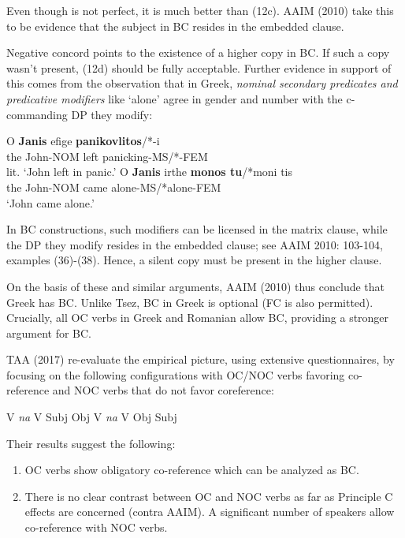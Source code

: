 \documentclass[output=paper]{langsci/langscibook}
\begin{document}
Even though  is not perfect, it is much better than (12c). AAIM (2010) take this to be evidence that the subject in BC resides in the embedded clause. 

Negative concord points to the existence of a higher copy in BC. If such a copy wasn’t present, (12d) should be fully acceptable. Further evidence in support of this comes from the observation that in Greek, \textit{nominal secondary predicates and predicative modifiers} like ‘alone’ agree in gender and number with the c-commanding DP they modify:

\ea%
    \label{ex:alexiadou:13}
\ea \gll  O    \textbf{Janis}        efige  \textbf{panikovlitos}/*-i      \\
             the John-NOM  left    panicking-MS/*-FEM\\ 
    \glt        lit. ‘John left in panic.’
\ex \gll O    \textbf{Janis}         irthe   \textbf{monos tu}/*moni tis\\
               the John-NOM  came   alone-MS/*alone-FEM\\
    \glt       ‘John came alone.’  
    \z
\z


In BC constructions, such modifiers can be licensed in the matrix clause, while the DP they modify resides in the embedded clause; see AAIM 2010: 103-104, examples (36)-(38). Hence, a silent copy must be present in the higher clause. 

On the basis of these and similar arguments, AAIM (2010) thus conclude that Greek has BC. Unlike Tsez, BC in Greek is optional (FC is also permitted). Crucially, all OC verbs in Greek and Romanian allow BC, providing a stronger argument for BC.

TAA (2017) re-evaluate the empirical picture, using extensive questionnaires, by focusing on the following configurations with OC/NOC verbs favoring co-reference and NOC verbs that do not favor coreference:


\ea%
    \label{ex:alexiadou:14}
    \ea V \textit{na} V Subj Obj
    \ex V \textit{na} V Obj Subj
    \z
\z

Their results suggest the following:

\begin{enumerate}
\item OC verbs show obligatory co-reference which can be analyzed as BC.
\item There is no clear contrast between OC and NOC verbs as far as Principle C effects are concerned (contra AAIM). A significant number of speakers allow co-reference with NOC verbs. 
\end{enumerate}
\end{document}
